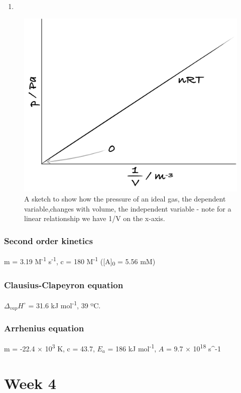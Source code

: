 \documentclass[
]{book}
\begin{document}
\begin{enumerate}
\def\labelenumi{\arabic{enumi}.}
\setcounter{enumi}{2}
\item
\end{enumerate}

\begin{figure}

{\centering \includegraphics[width=0.3\linewidth]{images/pVsketch} 

}

\caption{A sketch to show how the pressure of an ideal gas, the dependent variable,changes with volume, the independent variable - note for a linear relationship we have 1/V on the x-axis.}\label{fig:pV}
\end{figure}

\hypertarget{subsec:2ndkinteticsans}{%
\subsection{Second order kinetics}\label{subsec:2ndkinteticsans}}

m = 3.19 M\textsuperscript{-1} s\textsuperscript{-1}, c = 180 M\textsuperscript{-1} ({[}A{]}\textsubscript{0} = 5.56 mM)

\hypertarget{subsec:clausiusans}{%
\subsection{Clausius-Clapeyron equation}\label{subsec:clausiusans}}

\(\Delta _{vap}H^\circ\) = 31.6 kJ mol\textsuperscript{-1}, 39 ºC.

\hypertarget{subsec:arrheniusans}{%
\subsection{Arrhenius equation}\label{subsec:arrheniusans}}

m = -22.4 × 10\textsuperscript{3} K, c = 43.7, \(E_a\) = 186 kJ mol\textsuperscript{-1}, \(A\) = 9.7 × 10\textsuperscript{18} s\^{}-1

\hypertarget{ch:Workshop4}{%
\chapter{Week 4}\label{ch:Workshop4}}
\end{document}
